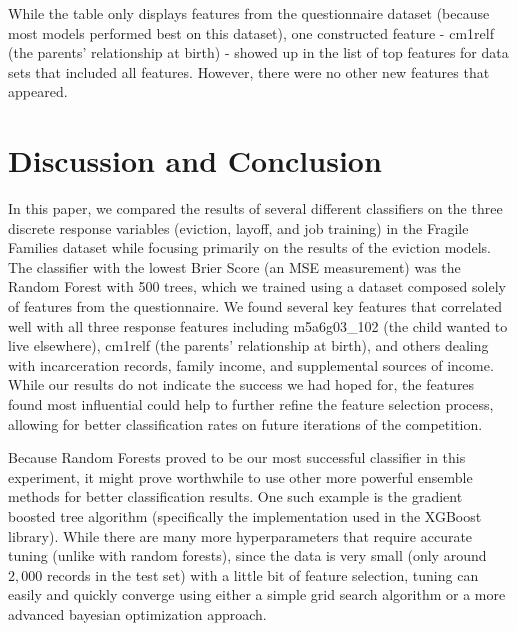 \documentclass{article} %
\begin{document}
While the table only displays features from the questionnaire dataset (because most models performed best on this dataset), one constructed feature - cm1relf (the parents' relationship at birth) - showed up in the list of top features for data sets that included all features. However, there were no other new features that appeared.

\section{Discussion and Conclusion}

In this paper, we compared the results of several different classifiers on the three discrete response variables (eviction, layoff, and job training) in the Fragile Families dataset while focusing primarily on the results of the eviction models. The classifier with the lowest Brier Score (an MSE measurement) was the Random Forest with 500 trees, which we trained using a dataset composed solely of features from the questionnaire. We found several key features that correlated well with all three response features including m5a6g03\_102 (the child wanted to live elsewhere), cm1relf (the parents' relationship at birth), and others dealing with incarceration records, family income, and supplemental sources of income. While our results do not indicate the success we had hoped for, the features found most influential could help to further refine the feature selection process, allowing for better classification rates on future iterations of the competition.

Because Random Forests proved to be our most successful classifier in this experiment, it might prove worthwhile to use other more powerful ensemble methods for better classification results. One such example is the gradient boosted tree algorithm (specifically the implementation used in the XGBoost library). While there are many more hyperparameters that require accurate tuning (unlike with random forests), since the data is very small (only around $2,000$ records in the test set) with a little bit of feature selection, tuning can easily and quickly converge using either a simple grid search algorithm or a more advanced bayesian optimization approach.




\end{document}
